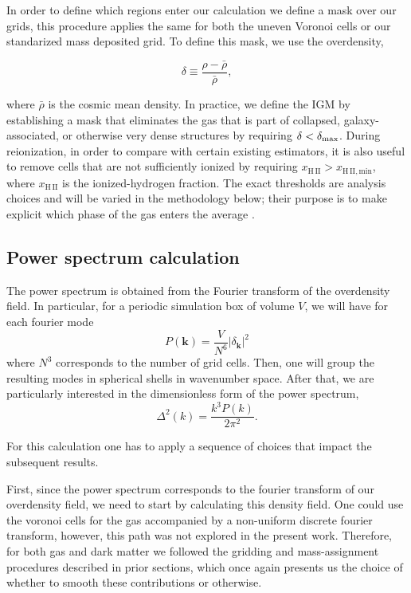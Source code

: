 \documentclass[%
 reprint,
nofootinbib,
 amsmath,amssymb,
 aps,
]{revtex4-2}
\begin{document}
In order to define which regions enter our calculation we define a mask over our grids, this procedure applies the same for both the uneven Voronoi cells or our standarized mass deposited grid. To define this mask, we use the overdensity,

\begin{equation}
\delta \equiv \frac{\rho - \bar\rho}{\bar\rho},
\end{equation}

where $\bar\rho$ is the cosmic mean density. In practice, we define the IGM by establishing a mask that eliminates the gas that is part of collapsed, galaxy-associated, or otherwise very dense structures by requiring $\delta<\delta_{\rm max}$. During reionization, in order to compare with certain existing estimators, it is also useful to remove cells that are not sufficiently ionized by requiring $x_{\mathrm{H\,II}}>x_{\mathrm{H\,II,min}}$, where $x_{\mathrm{H\,II}}$ is the ionized-hydrogen fraction. The exact thresholds are analysis choices and will be varied in the methodology below; their purpose is to make explicit which phase of the gas enters the average \cite{rahmati2013selfshielding,davies2024clumping}.


\subsection{Power spectrum calculation}

The power spectrum is obtained from the Fourier transform of the overdensity field. In particular, for a periodic simulation box of volume $V$, we will have for each fourier mode \cite{jing2005correcting}
\begin{equation}
P(\mathbf{k}) = \frac{V}{N^6}|\delta_{\mathbf{k}}|^2
\end{equation}
where $N^3$ corresponds to the number of grid cells. Then, one will group the resulting modes in spherical shells in wavenumber space. After that, we are particularly interested in the dimensionless form of the power spectrum,
\begin{equation}
\Delta^2(k) = \frac{k^3 P(k)}{2\pi^2}.
\end{equation}

For this calculation one has to apply a sequence of choices that impact the subsequent results. 

First, since the power spectrum corresponds to the fourier transform of our overdensity field, we need to start by calculating this density field. One could use the voronoi cells for the gas accompanied by a non-uniform discrete fourier transform, however, this path was not explored in the present work. Therefore, for both gas and dark matter we followed the gridding and mass-assignment procedures described in prior sections, which once again presents us the choice of whether to smooth these contributions or otherwise. 
\end{document}
